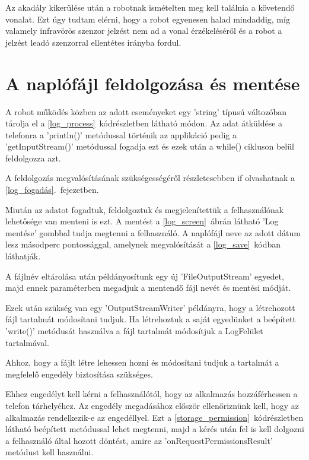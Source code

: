 \documentclass[]{thesis-ekf}
\theoremstyle{definition}
\begin{document}
Az akadály kikerülése után a robotnak ismételten meg kell találnia a követendő vonalat. Ezt úgy tudtam elérni, hogy a robot egyenesen halad mindaddig, míg valamely infravörös szenzor jelzést nem ad a vonal érzékeléséről és a robot a jelzést leadó szenzorral ellentétes irányba fordul.
\section{A naplófájl feldolgozása és mentése}
A robot működés közben az adott eseményeket egy 'string' típusú változóban tárolja el a \ref{log_process}~kódrészletben látható módon. Az adat átküldése a telefonra a 'println()' metódussal történik az applikáció pedig a 'getInputStream()' metódussal fogadja ezt és ezek után a while() cikluson belül feldolgozza azt.

A feldolgozás megvalósításának szükségességéről részletesebben if olvashatnak a \ref{log_fogadás}.~fejezetben.


Miután az adatot fogadtuk, feldolgoztuk és megjelenítettük a felhasználónak lehetősége van menteni is ezt. A mentést a \ref{log_screen}~ábrán látható 'Log mentése' gombbal tudja megtenni a felhasználó. A naplófájl neve az adott dátum lesz másodperc pontossággal, amelynek megvalósítását a \ref{log_save}~kódban láthatják.

A fájlnév eltárolása után példányosítunk egy új 'FileOutputStream' egyedet, majd ennek paraméterben megadjuk a mentendő fájl nevét és mentési módját.

Ezek után szükség van egy 'OutputStreamWriter' példányra, hogy a létrehozott fájl tartalmát módosítani tudjuk. Ha létrehoztuk a saját egyedünket a beépített 'write()' metódusát használva a fájl tartalmát módosítjuk a LogFelület tartalmával.


Ahhoz, hogy a fájlt létre lehessen hozni és módosítani tudjuk a tartalmát a megfelelő engedély biztosítása szükséges.

Ehhez engedélyt kell kérni a felhasználótól, hogy az alkalmazás hozzáférhessen a telefon tárhelyéhez. Az engedély megadásához először ellenőriznünk kell, hogy az alkalmazás rendelkezik-e az engedéllyel. Ezt a \ref{storage_permission}~kódrészletben látható beépített metódussal lehet megtenni, majd a kérés után fel is kell dolgozni a felhasználó által hozott döntést, amire az 'onRequestPermissionsResult' metódust kell használni.
\end{document}
